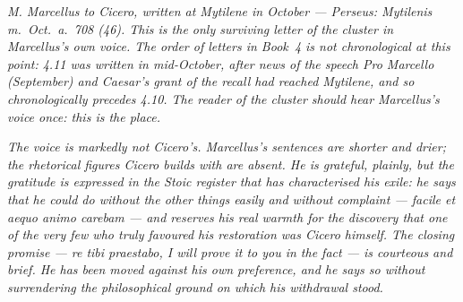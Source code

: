 
\textit{M. Marcellus to Cicero, written at Mytilene in October ---
Perseus: \textit{Mytilenis m.~Oct.~a.~708 (46)}. This is the only
surviving letter of the cluster in Marcellus's own voice. The
order of letters in Book~4 is not chronological at this point:
4.11 was written in mid-October, after news of the speech
\textit{Pro Marcello} (September) and Caesar's grant of the
recall had reached Mytilene, and so chronologically precedes
4.10. The reader of the cluster should hear Marcellus's voice
once: this is the place.}

\textit{The voice is markedly not Cicero's. Marcellus's sentences
are shorter and drier; the rhetorical figures Cicero builds with
are absent. He is grateful, plainly, but the gratitude is
expressed in the Stoic register that has characterised his
exile: he says that he could do without the other things easily
and without complaint --- \textit{facile et aequo animo
carebam} --- and reserves his real warmth for the discovery
that one of the very few who truly favoured his restoration was
Cicero himself. The closing promise --- \textit{re tibi
praestabo}, I will prove it to you in the fact --- is courteous
and brief. He has been moved against his own preference, and
he says so without surrendering the philosophical ground on
which his withdrawal stood.}

